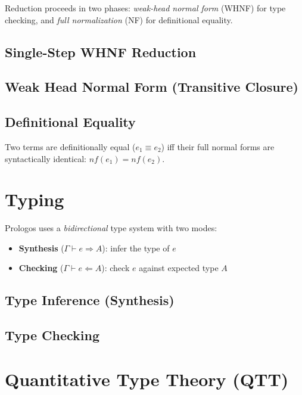 \documentclass[11pt]{article}
\begin{document}
Reduction proceeds in two phases: \emph{weak-head normal form} (WHNF) for
type checking, and \emph{full normalization} (NF) for definitional equality.

\subsection{Single-Step WHNF Reduction}

\ottdefnwhnfXXstep{}

\subsection{Weak Head Normal Form (Transitive Closure)}

\ottdefnwhnf{}

\subsection{Definitional Equality}

Two terms are definitionally equal ($e_1 \equiv e_2$) iff their full normal
forms are syntactically identical: $\mathit{nf}(e_1) = \mathit{nf}(e_2)$.


\section{Typing}

Prologos uses a \emph{bidirectional} type system with two modes:
\begin{itemize}
  \item \textbf{Synthesis} ($\Gamma \vdash e \Rightarrow A$): infer the type of $e$
  \item \textbf{Checking} ($\Gamma \vdash e \Leftarrow A$): check $e$ against expected type $A$
\end{itemize}

\subsection{Type Inference (Synthesis)}

\ottdefninfer{}

\subsection{Type Checking}

\ottdefncheck{}


\section{Quantitative Type Theory (QTT)}
\end{document}
